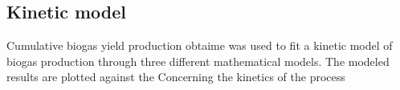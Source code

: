 \subsection{Kinetic model}
Cumulative biogas yield production obtaime was used to fit a kinetic model of biogas production through three different mathematical models. The modeled results are plotted against the
Concerning the kinetics of the process